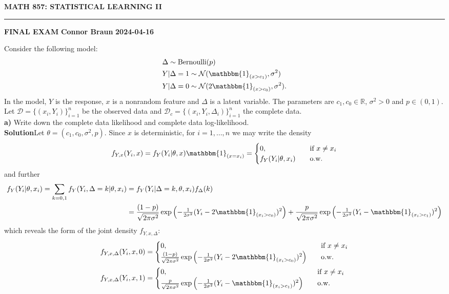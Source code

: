 \documentclass[10pt]{article}
\newcommand{\bp}[1]{\left({#1}\right)}
\newcommand{\mbb}[1]{\mathbb{#1}}
\newcommand{\1}[1]{\mathbbm{1}_{#1}}
\newcommand{\mc}[1]{\mathcal{#1}}
\begin{document}
    \begin{center}
        {\bf\large{MATH 857: STATISTICAL LEARNING II}}
        \smallskip
        \hrule
        \smallskip
        {\bf FINAL EXAM} \hfill {\bf Connor Braun} \hfill {\bf 2024-04-16}
    \end{center}
\hspace{5pt} Consider the following model:
\begin{align*}
    &\Delta\sim\text{Bernoulli}(p)\\
    &Y|\Delta=1\sim\mc{N}(\mathbbm{1}_{(x>c_1)},\sigma^2)\\
    &Y|\Delta=0\sim\mc{N}(2\mathbbm{1}_{(x>c_0)}, \sigma^2).
\end{align*}
In the model, $Y$ is the response, $x$ is a nonrandom feature and $\Delta$ is a latent variable. The parameters are
$c_1,c_0\in\mbb{R}$, $\sigma^2>0$ and $p\in(0,1)$.
Let $\mc{D}=\{(x_i,Y_i)\}_{i=1}^n$ be the observed data and $\mc{D}_c=\{(x_i,Y_i,\Delta_i)\}_{i=1}^n$ the complete data.\\[5pt]
{\bf a)}\hspace{5pt} Write down the complete data likelihood and complete data log-likelihood.\\[5pt]
{\bf Solution}\hspace{5pt}Let $\theta=(c_1,c_0,\sigma^2,p)$. Since $x$ is deterministic, for $i=1,\dots, n$ we may write the density
\begin{align*}
    f_{Y,x}(Y_i,x)=f_Y(Y_i|\theta, x)\mathbbm{1}_{(x=x_i)}=\begin{cases}
        0,\quad&\text{if $x\neq x_i$}\\
        f_Y(Y_i|\theta,x_i)\quad&\text{o.w.}
    \end{cases}
\end{align*}
and further
\begin{align*}
    f_Y(Y_i|\theta,x_i)=\sum_{k=0,1}f_Y(Y_i,\Delta=k|\theta,x_i)&=f_Y(Y_i|\Delta=k,\theta,x_i)f_\Delta(k)\\
    &=\frac{(1-p)}{\sqrt{2\pi\sigma^2}}\exp\bp{-\tfrac{1}{2\sigma^2}(Y_i-2\mathbbm{1}_{(x_i>c_0)})^2}+\frac{p}{\sqrt{2\pi\sigma^2}}\exp\bp{-\tfrac{1}{2\sigma^2}(Y_i-\mathbbm{1}_{(x_i>c_1)})^2}
\end{align*}
which reveals the form of the joint density $f_{Y,x,\Delta}$:
\begin{align*}
    f_{Y,x,\Delta}(Y_i,x,0)&=\begin{cases}
        0,\quad&\text{if $x\neq x_i$}\\
        \frac{(1-p)}{\sqrt{2\pi\sigma^2}}\exp\bp{-\tfrac{1}{2\sigma^2}(Y_i-2\mathbbm{1}_{(x_i>c_0)})^2}\quad&\text{o.w.}
    \end{cases}\\
    f_{Y,x,\Delta}(Y_i,x,1)&=\begin{cases}
        0,\quad&\text{if $x\neq x_i$}\\
        \frac{p}{\sqrt{2\pi\sigma^2}}\exp\bp{-\tfrac{1}{2\sigma^2}(Y_i-\mathbbm{1}_{(x_i>c_1)})^2}\quad&\text{o.w.}
    \end{cases}
\end{align*}
\end{document}
